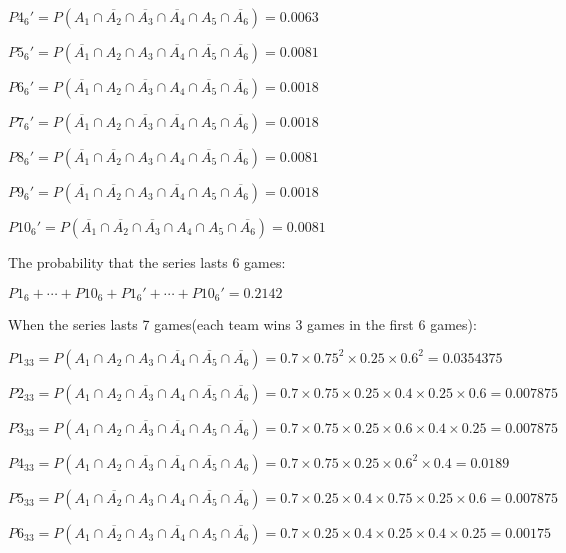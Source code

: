 \documentclass{article}
\begin{document}
	$P4_6'=P(A_1\cap \overline{A_2}\cap \overline{A_3}\cap \overline{A_4} \cap A_5\cap \overline{A_6})=0.0063$
	
	$P5_6'=P(\overline{A_1}\cap A_2\cap A_3\cap \overline{A_4} \cap \overline{A_5}\cap \overline{A_6})=0.0081 $
	
	$P6_6'=P(\overline{A_1}\cap A_2\cap \overline{A_3}\cap A_4 \cap \overline{A_5}\cap \overline{A_6})= 0.0018$
	
	$P7_6'=P(\overline{A_1}\cap A_2\cap \overline{A_3}\cap \overline{A_4} \cap A_5\cap \overline{A_6})= 0.0018$
	
	$P8_6'=P(\overline{A_1}\cap \overline{A_2}\cap A_3\cap A_4 \cap \overline{A_5}\cap \overline{A_6})=0.0081$
	
	$P9_6'=P(\overline{A_1}\cap \overline{A_2}\cap A_3\cap \overline{A_4} \cap A_5\cap \overline{A_6})= 0.0018$
	
	$P10_6'=P(\overline{A_1}\cap \overline{A_2}\cap \overline{A_3}\cap A_4 \cap A_5\cap \overline{A_6})=0.0081$
	
	The probability that the series lasts 6 games:
	
	$P1_6+\cdots+P10_6+P1_6'+\cdots+P10_6'=0.2142$
	
	\hspace*{\fill}
	
	When the series lasts 7 games(each team wins 3 games in the first 6 games):
	
	$P1_{33}=P(A_1\cap A_2\cap A_3\cap \overline{A_4}\cap \overline{A_5}\cap \overline{A_6})=0.7\times 0.75^2\times 0.25\times 0.6^2=0.0354375$
	
	$P2_{33}=P(A_1\cap A_2\cap \overline{A_3}\cap A_4\cap \overline{A_5}\cap \overline{A_6})=0.7\times 0.75\times 0.25\times 0.4\times 0.25\times 0.6=0.007875$
	
	$P3_{33}=P(A_1\cap A_2\cap \overline{A_3}\cap \overline{A_4}\cap A_5\cap \overline{A_6})=0.7\times 0.75\times 0.25\times 0.6\times 0.4\times 0.25=0.007875$
	
	$P4_{33}=P(A_1\cap A_2\cap \overline{A_3}\cap \overline{A_4}\cap \overline{A_5}\cap A_6)=0.7\times 0.75\times 0.25\times 0.6^2\times 0.4=0.0189$
	
	$P5_{33}=P(A_1\cap \overline{A_2}\cap A_3\cap A_4\cap \overline{A_5}\cap \overline{A_6})=0.7\times 0.25\times 0.4\times 0.75\times 0.25\times 0.6=0.007875 $
	
	$P6_{33}=P(A_1\cap \overline{A_2}\cap A_3\cap \overline{A_4}\cap A_5\cap \overline{A_6})=0.7\times 0.25\times 0.4\times 0.25\times 0.4\times 0.25=0.00175$
	
\end{document}

